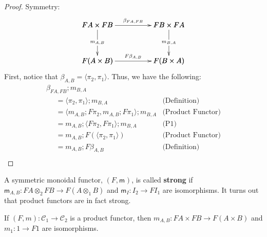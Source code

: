\documentclass{article}
\let\mto\to
\let\to\rightarrow
\newcommand{\cat}[1]{\mathcal{#1}}
\newcommand{\m}[1]{\mathsf{m}_{#1}}
\begin{document}
\begin{proof}
\item[] Symmetry:\\
  \[
  \bfig
  \square|amma|/->`->`->`->/<1000,500>[
    FA \times FB`
    FB \times FA`
    F(A \times B)`
    F(B \times A);
    {\beta}_{FA,FB}`
    m_{A,B}`
    m_{B,A}`
    F{\beta}_{A,B}]
  \efig
  \]
  First, notice that $\beta_{A,B} = \langle \pi_2, \pi_1 \rangle$.  Thus, we have the following:
  \[
  \begin{array}{lll}
    \beta_{FA,FB};m_{B,A}\\
    \,\,\,\,\,\,\,\,=  \langle \pi_2, \pi_1 \rangle;m_{B,A} & \text{(Definition)}\\
    \,\,\,\,\,\,\,\,=  \langle m_{A,B};F\pi_2, m_{A,B};F\pi_1 \rangle;m_{B,A} & \text{(Product Functor)}\\
    \,\,\,\,\,\,\,\,=  m_{A,B};\langle F\pi_2, F\pi_1 \rangle;m_{B,A} & \text{(P1)}\\
    \,\,\,\,\,\,\,\,=  m_{A,B};F(\langle \pi_2, \pi_1 \rangle) & \text{(Product Functor)}\\
    \,\,\,\,\,\,\,\,=  m_{A,B};F\beta_{A,B} & \text{(Definition)}\\
  \end{array}
  \]
\end{proof}
\fi
\noindent
A symmetric monoidal functor, $(F, \m{})$, is called \textbf{strong}
if $\m{A,B} : FA \otimes_2 FB \mto F(A \otimes_1 B)$ and $\m{I} : I_2
\mto FI_1$ are isomorphisms.  It turns out that product functors are
in fact strong.
\begin{lemma}
  \label{lemma:product_functors_iso}
  If $(F,m) : \cat{C}_1 \mto \cat{C}_2$ is a product functor, then
  $m_{A,B} : FA \times FB \mto F(A \times B)$ and $m_1 : 1 \mto F1$ are
  isomorphisms.
\end{lemma}
\iffalse
\end{document}
